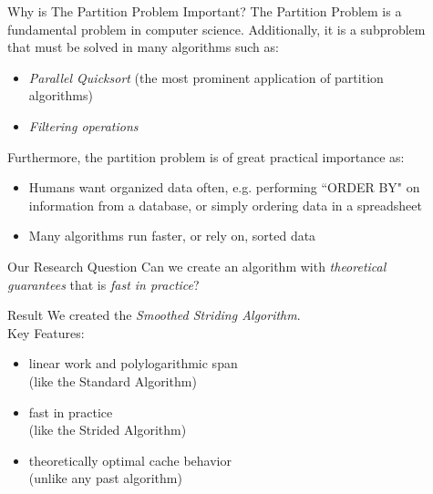 \documentclass[table,serif,mathserif,final]{beamer}
\theoremstyle{remark}
\begin{document}
\begin{frame}{}
\begin{columns}[t]
\begin{column}{0.02\linewidth}
\end{column}

\begin{column}{0.2\linewidth}

\begin{block}{\Huge Why is The Partition Problem Important?}
  \justifying
  \Huge
  The Partition Problem is a fundamental problem in computer science. Additionally, it is a subproblem that must be solved in many algorithms such as:
  \begin{itemize}
    \item \emph{Parallel Quicksort} (the most prominent application of partition algorithms)
    \item \emph{Filtering operations}
  \end{itemize}
  Furthermore, the partition problem is of great practical importance as:
  \begin{itemize}
    \item Humans want organized data often, e.g. performing ``ORDER BY" on information from a database, or simply ordering data in a spreadsheet 
    \item Many algorithms run faster, or rely on, sorted data 
  \end{itemize}
\end{block}
\vspace{0.5cm}

\begin{block}{\Huge Our Research Question}
  \justifying
  \Huge Can we create an algorithm with \emph{theoretical guarantees} that is \emph{fast in practice}?
\end{block}

\vspace{0.5cm}
\begin{block}{\Huge Result}
  \justifying
  \Huge We created the \emph{Smoothed Striding Algorithm}. \\
  Key Features:
	\begin{itemize}
		\item linear work and polylogarithmic span \\
			{\color{blue} (like the Standard Algorithm)\\}
		\vspace{0.15cm}
		\item fast in practice \\
			{\color{blue} (like the Strided Algorithm)\\}
	\vspace{0.15cm}
		\item theoretically optimal cache behavior \\
			{\color{blue} (unlike any past algorithm)}
	\end{itemize}
\end{block}


\end{column}
\end{columns}
\end{frame}
\end{document}

